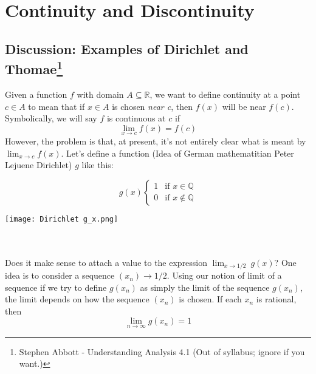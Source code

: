 
\section{Continuity and Discontinuity}


\subsection[Discussion: Examples of Dirichlet and Thomae]{Discussion: Examples of Dirichlet and Thomae\footnote{Stephen Abbott - Understanding Analysis 4.1 (Out of syllabus; ignore if you want.)}}
Given a function $f$ with domain $A \subseteq \mathbb{R}$, we want to define continuity at a point $c \in A$ to mean that if $x \in A$ is chosen \textit{near c}, then $f(x)$ will be near $f(c)$. \\
Symbolically, we will say $f$ is continuous at $c$ if
$$ \lim_{x \to c} f(x) = f(c) $$
However, the problem is that, at present, it's not entirely clear what is meant by $ \lim_{x \to c} f(x) $. Let's define a function (Idea of German mathematitian Peter Lejuene Dirichlet) $g$ like this:\\
\begin{minipage}{0.45\textwidth}
    \begin{equation*}
        g(x)
        \begin{cases}
            1 & \text{if } x \in \mathbb{Q} \\
            0 & \text{if } x \notin \mathbb{Q}
        \end{cases}
    \end{equation*}
\end{minipage}
\begin{minipage}{0.45\textwidth}
    \centering
    \texttt{[image: Dirichlet g\_x.png]}
\end{minipage} \\~\\
Does it make sense to attach a value to the expression $\lim_{x \to 1/2} \ g(x)$? One idea is to consider a sequence $(x_n) \to 1/2$. Using our notion of limit of a sequence if we try to define $g(x_n)$  as simply the limit of the sequence $g(x_n)$, the limit depends on how the sequence $(x_n)$ is chosen. If each $x_n$ is rational, then \[
    \lim_{n \to \infty} g(x_n) = 1
\]
